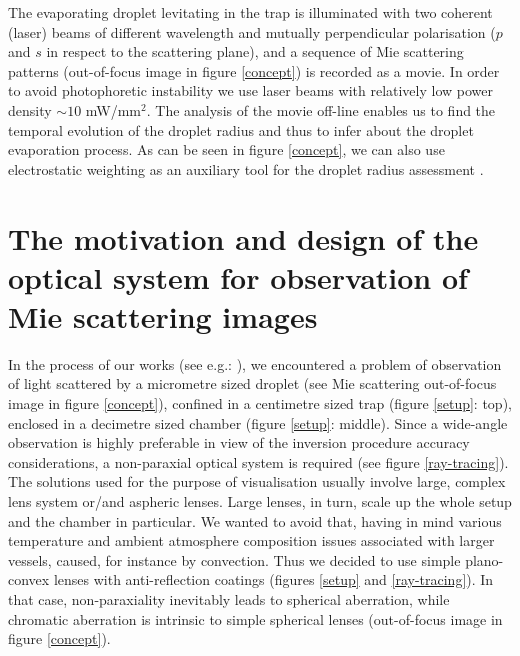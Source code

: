 \documentclass[preprint,review,12pt,dvips]{elsarticle}
\begin{document}
The evaporating droplet levitating in the trap is illuminated with two coherent (laser) beams of different wavelength and
mutually perpendicular polarisation ($p$ and $s$ in respect to the scattering plane), and a sequence of Mie scattering
patterns (out-of-focus image in figure \ref{concept}) is recorded as a movie. In order to avoid photophoretic instability
we use laser beams with relatively low power density $\sim 10$ mW/mm$^2$. The analysis of the movie off-line enables us to
find the temporal evolution of the droplet radius and thus to infer about the droplet evaporation process. As can be seen
in figure \ref{concept}, we can also use electrostatic weighting as an auxiliary tool for the droplet radius assessment
\cite{weightvsscatt}.

\section{The motivation and design of the optical system for observation of Mie scattering images}
In the process of our works (see e.g.: \cite{RoP,weightvsscatt}), we encountered a problem of observation of light
scattered by a micrometre sized droplet (see Mie scattering out-of-focus image in figure \ref{concept}), confined in a
centimetre sized trap (figure \ref{setup}: top), enclosed in a decimetre sized chamber (figure \ref{setup}: middle). Since
a wide-angle observation is highly preferable in view of the inversion procedure accuracy considerations, a non-paraxial
optical system is required (see figure \ref{ray-tracing}). The solutions used for the purpose of visualisation usually
involve large, complex lens system or/and aspheric lenses. Large lenses, in turn, scale up the whole setup and the chamber
in particular. We wanted to avoid that, having in mind various temperature and ambient atmosphere composition issues
associated with larger vessels, caused, for instance by convection. Thus we decided to use simple plano-convex lenses with
anti-reflection coatings (figures \ref{setup} and \ref{ray-tracing}). In that case, non-paraxiality inevitably leads to
spherical aberration, while chromatic aberration is intrinsic to simple spherical lenses (out-of-focus image in figure
\ref{concept}).
\end{document}
